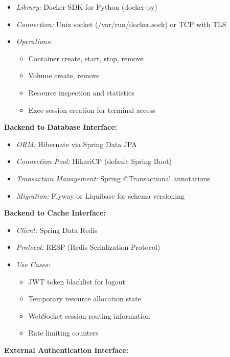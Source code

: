\documentclass[12pt,a4paper]{article}
\begin{document}
\begin{itemize}
    \item \textit{Library:} Docker SDK for Python (docker-py)
    \item \textit{Connection:} Unix socket (/var/run/docker.sock) or TCP with TLS
    \item \textit{Operations:}
    \begin{itemize}
        \item Container create, start, stop, remove
        \item Volume create, remove
        \item Resource inspection and statistics
        \item Exec session creation for terminal access
    \end{itemize}
\end{itemize}

\textbf{Backend to Database Interface:}

\begin{itemize}
    \item \textit{ORM:} Hibernate via Spring Data JPA
    \item \textit{Connection Pool:} HikariCP (default Spring Boot)
    \item \textit{Transaction Management:} Spring @Transactional annotations
    \item \textit{Migration:} Flyway or Liquibase for schema versioning
\end{itemize}

\textbf{Backend to Cache Interface:}

\begin{itemize}
    \item \textit{Client:} Spring Data Redis
    \item \textit{Protocol:} RESP (Redis Serialization Protocol)
    \item \textit{Use Cases:}
    \begin{itemize}
        \item JWT token blacklist for logout
        \item Temporary resource allocation state
        \item WebSocket session routing information
        \item Rate limiting counters
    \end{itemize}
\end{itemize}

\textbf{External Authentication Interface:}
\end{document}
